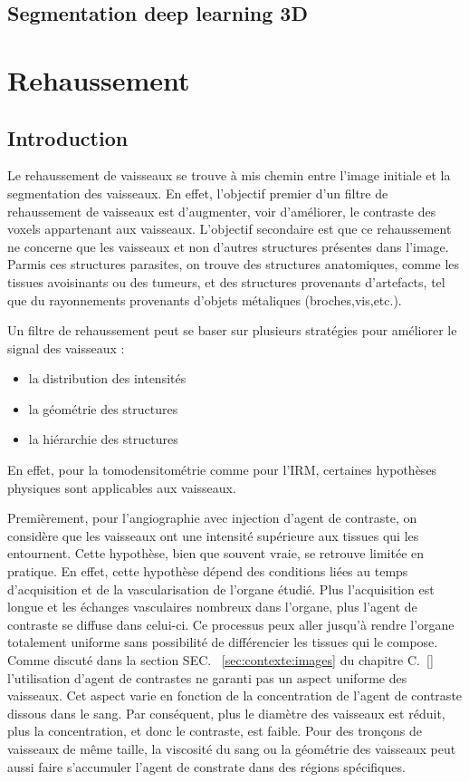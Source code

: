 \subsection{Segmentation deep learning 3D}
\label{sec:EA:segmentation_deep3D}

\section{Rehaussement}
\label{sec:EA:rehaussement}
\subsection{Introduction}
\label{sec:EA:rehaussement:introduction}
Le rehaussement de vaisseaux se trouve à mis chemin entre l'image initiale et la segmentation des vaisseaux. En effet, l'objectif premier d'un filtre de rehaussement de vaisseaux est d'augmenter, voir d'améliorer, le contraste des voxels appartenant aux vaisseaux. L'objectif secondaire est que ce rehaussement ne concerne que les vaisseaux et non d'autres structures présentes dans l'image. Parmis ces structures parasites, on trouve des structures anatomiques, comme les tissues avoisinants ou des tumeurs, et des structures provenants d'artefacts, tel que du rayonnements provenants d'objets métaliques (broches,vis,etc.).

Un filtre de rehaussement peut se baser sur plusieurs stratégies pour améliorer le signal des vaisseaux :

\begin{itemize}
\item la distribution des intensités
\item la géométrie des structures
\item la hiérarchie des structures
\end{itemize}

En effet, pour la tomodensitométrie comme pour l'IRM, certaines hypothèses physiques sont applicables aux vaisseaux.

Premièrement, pour l'angiographie avec injection d'agent de contraste, on considère que les vaisseaux ont une intensité supérieure aux tissues qui les entournent. Cette hypothèse, bien que souvent vraie, se retrouve limitée en pratique. En effet, cette hypothèse dépend des conditions liées au temps d'acquisition et de la vascularisation de l'organe étudié. Plus l'acquisition est longue et les échanges vasculaires nombreux dans l'organe, plus l'agent de contraste se diffuse dans celui-ci. Ce processus peux aller jusqu'à rendre l'organe totalement uniforme sans possibilité de différencier les tissues qui le compose. Comme discuté dans la section SEC. ~\ref{sec:contexte:images} du chapitre C.~\ref{} l'utilisation d'agent de contrastes ne garanti pas un aspect uniforme des vaisseaux. Cet aspect varie en fonction de la concentration de l'agent de contraste dissous dans le sang. Par conséquent, plus le diamètre des vaisseaux est réduit, plus la concentration, et donc le contraste, est faible. Pour des tronçons de vaisseaux de même taille, la viscosité du sang ou la géométrie des vaisseaux peut aussi faire s'accumuler l'agent de constrate dans des régions spécifiques.

